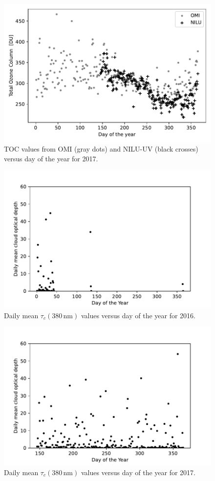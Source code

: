 \documentclass{optica-article}
\begin{document}
\begin{figure}[H]
	\centering
	\includegraphics[width=0.7\linewidth]{OMI_L3_NILU_O3_2017}
	\caption{TOC values from OMI (gray dots) and NILU-UV (black crosses) versus day of the year for 2017.}
	\label{fig:omil3niluo32017}
\end{figure}

\begin{figure}[H]
	\centering
	\includegraphics[width=0.7\linewidth]{COD_vs_DOY_2016}
	\caption{Daily mean $\tau_c{\scriptstyle(380 \, \text{nm})}$ values versus day of the year for 2016.}
	\label{fig:codvsdoy2016}
\end{figure}


\begin{figure}[H]
	\centering
	\includegraphics[width=0.7\linewidth]{COD_vs_DOY_2017}
	\caption{Daily mean $\tau_c{\scriptstyle(380 \, \text{nm})}$ values versus day of the year for 2017.}
	\label{fig:codvsdoy2017}
\end{figure}






\end{document}
